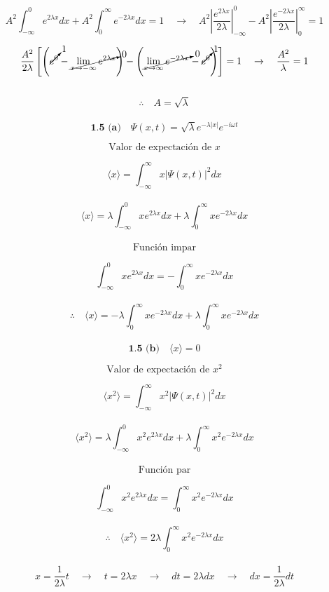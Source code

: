 \documentclass[10pt,a4papper]{article}
\begin{document}
\[A^2\int_{-\infty}^0 e^{2\lambda x}dx+A^2\int_0^\infty e^{-2\lambda x}dx=1\quad\to\quad
A^2\left|\frac{e^{2\lambda x}}{2\lambda}\right|_{-\infty}^0-A^2\left|\frac{e^{-2\lambda x}}{2\lambda}\right|_0^\infty=1\]

\[\frac{A^2}{2\lambda}\left[
  \left(\cancelto{1}{e^{0}}-\cancelto{0}{\lim_{x\to-\infty}e^{2\lambda x}}\right)
  -\left(\cancelto{0}{\lim_{x\to\infty}e^{-2\lambda x}}-\cancelto{1}{e^{0}}\right)\right]=1\quad\to\quad
\frac{A^2}{\lambda}=1\]\\

\[\boxed{\therefore\quad A=\sqrt{\lambda}}\]\\

\[\boxed{\textbf{1.5 (a)}\quad\Psi(x,t)=\sqrt{\lambda}e^{-\lambda|x|}e^{-i\omega t}}\]

\newpage
\[\text{Valor de expectación de }x\]

\[\langle x\rangle=\int_{-\infty}^\infty x|\Psi(x,t)|^2dx\]\\

\[\langle x\rangle=\lambda\int_{-\infty}^0 xe^{2\lambda x}dx+\lambda\int_0^\infty xe^{-2\lambda x}dx\]\\

\[\text{Función impar}\]

\[\int_{-\infty}^0 xe^{2\lambda x}dx=-\int_0^\infty xe^{-2\lambda x}dx\]\\

\[\therefore\quad\langle x\rangle=-\lambda\int_0^\infty xe^{-2\lambda x}dx+\lambda\int_0^\infty xe^{-2\lambda x}dx\]\\

\[\boxed{\textbf{1.5 (b)}\quad\langle x\rangle=0}\]

\newpage
\[\text{Valor de expectación de }x^2\]

\[\langle x^2\rangle=\int_{-\infty}^\infty x^2|\Psi(x,t)|^2dx\]\\

\[\langle x^2\rangle=\lambda\int_{-\infty}^0 x^2e^{2\lambda x}dx+\lambda\int_0^\infty x^2e^{-2\lambda x}dx\]\\

\[\text{Función par}\]

\[\int_{-\infty}^0 x^2e^{2\lambda x}dx=\int_0^\infty x^2e^{-2\lambda x}dx\]\\

\[\therefore\quad\langle x^2\rangle=2\lambda\int_0^\infty x^2e^{-2\lambda x}dx\]\\

\[x=\frac{1}{2\lambda}t\quad\to\quad t=2\lambda x\quad\to\quad dt=2\lambda dx\quad\to\quad dx=\frac{1}{2\lambda}dt\]\\
\end{document}
